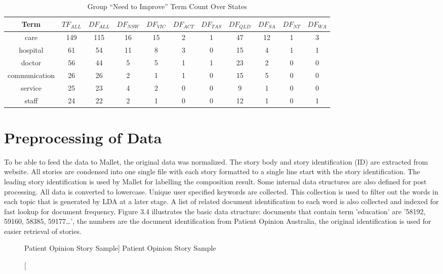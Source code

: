 \documentclass[11pt,twoside]{report}
\begin{document}
\begin{table}[h]
\tiny
\caption{Group ``Need to Improve'' Term Count Over States}
\centering
\begin{tabular}{| c | c | c | c | c | c | c | c |c | c | c |}
\hline\hline
Term & $TF_{ALL}$ & $DF_{ALL}$ & $DF_{NSW}$ & $DF_{VIC}$ & $DF_{ACT}$ & $DF_{TAS}$ & $DF_{QLD}$ & $DF_{SA}$ & $DF_{NT}$ & $DF_{WA}$ \\
\hline
care & 149 & 115 & 16 & 15 & 2 & 1 & 47 & 12 & 1 & 3 \\
\hline
hospital & 61 & 54 & 11 & 8 & 3 & 0 & 15 & 4 & 1 & 1 \\
\hline
doctor & 56 & 44 & 5 & 5 & 1 & 1 & 23 & 2 & 0 & 0 \\
\hline
communication & 26 & 26 & 2 & 1 & 1 & 0 & 15 & 5 & 0 & 0 \\
\hline
service & 25 & 23 & 4 & 2 & 0 & 0 & 9 & 1 & 0 & 0 \\
\hline
staff & 24 & 22 & 2 & 1 & 0 & 0 & 12 & 1 & 0 & 1 \\
\hline
\end{tabular}
\label{table:ImproveCount}
\end{table}

\section{Preprocessing of Data}

To be able to feed the data to Mallet, the original data was normalized. The story body and story identification (ID) are extracted from website. All stories are condensed into one single file with each story formatted to a single line start with the story identification. The leading story identification is used by Mallet for labelling the composition result. Some internal data structures are also defined for post processing. All data is converted to lowercase. Unique user specified keywords are collected. This collection is used to filter out the words in each topic that is generated by LDA at a later stage. A list of related document identification to each word is also collected and indexed for fast lookup for document frequency. Figure 3.4 illustrates the basic data structure: documents that contain term 'education' are '58192, 59160, 58385, 59177…', the numbers are the document identification from Patient Opinion Australia, the original identification is used for easier retrieval of stories.

\begin{figure}[tp]
    \begin{center}
    \caption
    [Patient Opinion Story Sample]
    {
    Patient Opinion Story Sample
    \label{Figure4}
    }
    \end{center}
\end{figure}
\end{document}
